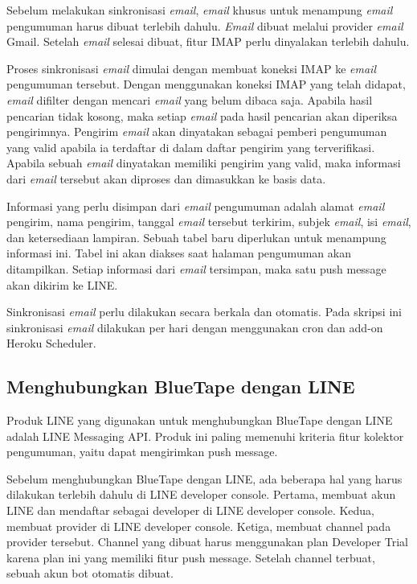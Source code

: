 	Sebelum melakukan sinkronisasi \textit{email}, \textit{email} khusus untuk menampung \textit{email} pengumuman harus dibuat terlebih dahulu. \textit{Email} dibuat melalui provider \textit{email} Gmail. Setelah \textit{email} selesai dibuat, fitur IMAP perlu dinyalakan terlebih dahulu.
	
	Proses sinkronisasi \textit{email} dimulai dengan membuat koneksi IMAP ke \textit{email} pengumuman tersebut. Dengan menggunakan koneksi IMAP yang telah didapat, \textit{email} difilter dengan mencari \textit{email} yang belum dibaca saja. Apabila hasil pencarian tidak kosong, maka setiap \textit{email} pada hasil pencarian akan diperiksa pengirimnya. Pengirim \textit{email} akan dinyatakan sebagai pemberi pengumuman yang valid apabila ia terdaftar di dalam daftar pengirim yang terverifikasi. Apabila sebuah \textit{email} dinyatakan memiliki pengirim yang valid, maka informasi dari \textit{email} tersebut akan diproses dan dimasukkan ke basis data.
	
	Informasi yang perlu disimpan dari \textit{email} pengumuman adalah alamat \textit{email} pengirim, nama pengirim, tanggal \textit{email} tersebut terkirim, subjek \textit{email}, isi \textit{email}, dan ketersediaan lampiran. Sebuah tabel baru diperlukan untuk menampung informasi ini. Tabel ini akan diakses saat halaman pengumuman akan ditampilkan. Setiap informasi dari \textit{email} tersimpan, maka satu push message akan dikirim ke LINE.
	
	Sinkronisasi \textit{email} perlu dilakukan secara berkala dan otomatis. Pada skripsi ini sinkronisasi \textit{email} dilakukan per hari dengan menggunakan cron dan add-on Heroku Scheduler.
	
\subsection{Menghubungkan BlueTape dengan LINE}
\label{sec:analisisline}
	Produk LINE yang digunakan untuk menghubungkan BlueTape dengan LINE adalah LINE Messaging API. Produk ini paling memenuhi kriteria fitur kolektor pengumuman, yaitu dapat mengirimkan push message.
	
	Sebelum menghubungkan BlueTape dengan LINE, ada beberapa hal yang harus dilakukan terlebih dahulu di LINE developer console. Pertama, membuat akun LINE dan mendaftar sebagai developer di LINE developer console. Kedua, membuat provider di LINE developer console. Ketiga, membuat channel pada provider tersebut. Channel yang dibuat harus menggunakan plan Developer Trial karena plan ini yang memiliki fitur push message. Setelah channel terbuat, sebuah akun bot otomatis dibuat.
	
